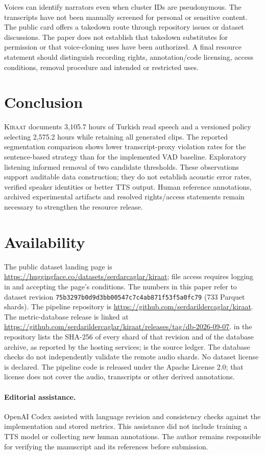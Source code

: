 \documentclass[11pt,a4paper]{article}
\begin{document}
Voices can identify narrators even when cluster IDs are pseudonymous. The
transcripts have not been manually screened for personal or sensitive content.
The public card offers a takedown route through repository issues or dataset
discussions. The paper does not establish that takedown substitutes for
permission or that voice-cloning uses have been authorized. A final resource
statement should distinguish recording rights, annotation/code licensing,
access conditions, removal procedure and intended or restricted uses.

\section{Conclusion}
\textsc{Kiraat} documents 3,105.7 hours of Turkish read speech and a versioned
policy selecting 2,575.2 hours while retaining all generated clips. The reported
segmentation comparison shows lower transcript-proxy violation rates for the
sentence-based strategy than for the implemented VAD baseline. Exploratory
listening informed removal of two candidate thresholds. These observations
support auditable data construction; they do not establish acoustic error
rates, verified speaker identities or better TTS output. Human reference
annotations, archived experimental artifacts and resolved rights/access
statements remain necessary to strengthen the resource release.

\section*{Availability}
The public dataset landing page is
\url{https://huggingface.co/datasets/serdarcaglar/kiraat}; file access requires
logging in and accepting the page's conditions. The numbers in this paper
refer to dataset revision \texttt{75b3297b0d9d3bb00547c7c4ab871f53f5a0fc79}
(733 Parquet shards). The pipeline repository is
\url{https://github.com/serdarildercaglar/kiraat}. The metric-database release
is linked at \url{https://github.com/serdarildercaglar/kiraat/releases/tag/db-2026-09-07}.
 in the repository lists the SHA-256 of
every shard of that revision and of the database archive, as reported by
the hosting services;  is the source ledger.
The database checks do not independently validate the remote audio shards.
No dataset license is declared. The pipeline code is released under the
Apache License 2.0; that license does not cover the audio, transcripts or
other derived annotations.

\paragraph{Editorial assistance.}
OpenAI Codex assisted with language revision and consistency checks against
the implementation and stored metrics. This assistance did not include
training a TTS model or collecting new human annotations. The author remains
responsible for verifying the manuscript and its references before submission.



\end{document}
